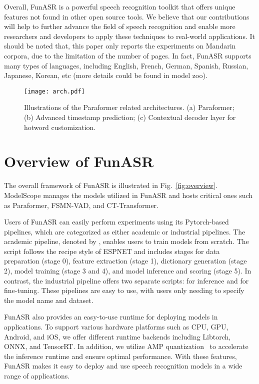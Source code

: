 \documentclass{INTERSPEECH2023}
\begin{document}
Overall, FunASR is a powerful speech recognition toolkit that offers unique features not found in other open source tools. We believe that our contributions will help to further advance the field of speech recognition and enable more researchers and developers to apply these techniques to real-world applications.
It should be noted that, this paper only reports the experiments on Mandarin corpora, due to the limitation of the number of pages. In fact, FunASR supports many types of languages, including English, French, German, Spanish, Russian, Japanese, Korean, etc (more details could be found in model zoo).


\begin{figure*}[h]
    \vspace{-3mm}
    \centering
    \texttt{[image: arch.pdf]}
    \caption{Illustrations of the Paraformer related architectures. (a) Paraformer; (b) Advanced timestamp prediction; (c) Contextual decoder layer for hotword customization.}\label{arch}
    \vspace{-6mm}
\end{figure*}


\section{Overview of FunASR}


The overall framework of FunASR is illustrated in Fig.~\ref{fig:overview}. ModelScope manages the models utilized in FunASR and hosts critical ones such as Paraformer, FSMN-VAD, and CT-Transformer.

Users of FunASR can easily perform experiments using its Pytorch-based pipelines, which are categorized as either academic or industrial pipelines. The academic pipeline, denoted by , enables users to train models from scratch.
The  script follows the recipe style of ESPNET and includes stages for data preparation (stage 0), feature extraction (stage 1), dictionary generation (stage 2), model training (stage 3 and 4), and model inference and scoring (stage 5). In contrast, the industrial pipeline offers two separate scripts:  for inference and  for fine-tuning. These pipelines are easy to use, with users only needing to specify the model name and dataset.

FunASR also provides an easy-to-use runtime for deploying models in applications. To support various hardware platforms such as CPU, GPU, Android, and iOS, we offer different runtime backends including Libtorch, ONNX, and TensorRT. In addition, we utilize AMP quantization~\cite{gao21f_interspeech} to accelerate the inference runtime and ensure optimal performance. With these features, FunASR makes it easy to deploy and use speech recognition models in a wide range of applications.
\end{document}
